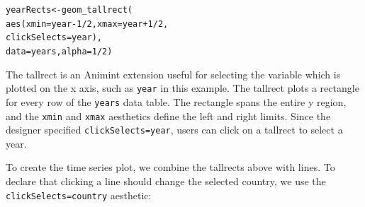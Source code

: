 \documentclass[10pt,journal,compsoc]{IEEEtran}\usepackage[]{graphicx}\usepackage[]{color}
\makeatletter
\newcommand{\hlnum}[1]{\textcolor[rgb]{0,0,0}{#1}}%
\newcommand{\hlopt}[1]{\textcolor[rgb]{0,0,0}{#1}}%
\newcommand{\hlstd}[1]{\textcolor[rgb]{0,0,0}{#1}}%
\newcommand{\hlkwb}[1]{\textcolor[rgb]{0,0,0}{#1}}%
\newcommand{\hlkwc}[1]{\textcolor[rgb]{0,0,1}{#1}}%
\newcommand{\hlkwd}[1]{\textcolor[rgb]{0,0,0}{#1}}%
\newenvironment{kframe}{%
 \def\at@end@of@kframe{}%
 \ifinner\ifhmode%
  \def\at@end@of@kframe{\end{minipage}}%
  \begin{minipage}{\columnwidth}%
 \fi\fi%
 \def\FrameCommand##1{\hskip\@totalleftmargin \hskip-\fboxsep
 \colorbox{shadecolor}{##1}\hskip-\fboxsep
     \hskip-\linewidth \hskip-\@totalleftmargin \hskip\columnwidth}%
 \MakeFramed {\advance\hsize-\width
   \@totalleftmargin\z@ \linewidth\hsize
   \@setminipage}}%
 {\par\unskip\endMakeFramed%
 \at@end@of@kframe}
\newenvironment{knitrout}{}{} %
\makeatother
\begin{document}
\begin{knitrout}
\color{fgcolor}\begin{kframe}
\begin{alltt}
\hlstd{yearRects} \hlkwb{<-} \hlkwd{geom_tallrect}\hlstd{(}
  \hlkwd{aes}\hlstd{(}\hlkwc{xmin}\hlstd{=year}\hlopt{-}\hlnum{1}\hlopt{/}\hlnum{2}\hlstd{,} \hlkwc{xmax}\hlstd{=year}\hlopt{+}\hlnum{1}\hlopt{/}\hlnum{2}\hlstd{,}
      \hlkwc{clickSelects}\hlstd{=year),}
  \hlkwc{data}\hlstd{=years,} \hlkwc{alpha}\hlstd{=}\hlnum{1}\hlopt{/}\hlnum{2}\hlstd{)}
\end{alltt}
\end{kframe}
\end{knitrout}

The tallrect is an Animint extension useful for selecting the variable
which is plotted on the x axis, such as \texttt{year} in this
example. The tallrect plots a rectangle for every row of the
\texttt{years} data table. The rectangle spans the entire y region,
and the \texttt{xmin} and \texttt{xmax} aesthetics define the left and
right limits. Since the designer specified \texttt{clickSelects=year},
users can click on a tallrect to select a year.





To create the time series plot, we combine the tallrects above with
lines. To declare that clicking a line should change the selected
country, we use the \texttt{clickSelects=country} aesthetic:
\end{document}

